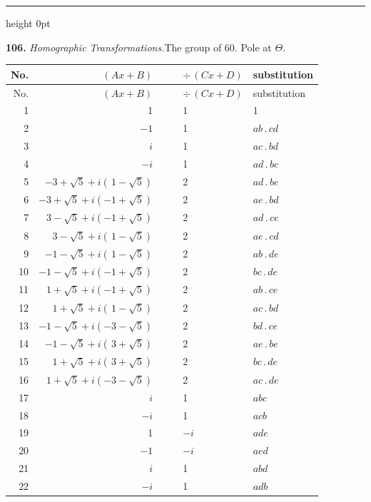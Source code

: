 \documentclass[11pt,a4paper]{article}
\newcommand{\artno}[1]{\textbf{#1.}\quad}
\begin{document}
\bigskip
\hrule height 0pt
\bigskip

\begin{center}
\artno{106} \textit{Homographic Transformations.}\quad The group of 60.
\quad Pole at $\Theta$.
\end{center}

\begin{center}
\footnotesize
\begin{longtable}{r|r|l|l|l|l}
No. & $(A x + B)$ & & & $\div\,(C x + D)$ & substitution\\\hline
\endfirsthead
No. & $(A x + B)$ & & & $\div\,(C x + D)$ & substitution\\\hline
\endhead
1  & 1 & & & 1 & 1\\
2  & $-1$ & & & 1 & $ab\,.\,cd$\\
3  & $i$ & & & 1 & $ac\,.\,bd$\\
4  & $-i$ & & & 1 & $ad\,.\,bc$\\
5  & $-3 + \sqrt5 + i(\,1 - \sqrt5)$ & & & 2 & $ad\,.\,be$\\
6  & $-3 + \sqrt5 + i(-1 + \sqrt5)$ & & & 2 & $ae\,.\,bd$\\
7  & $\;3 - \sqrt5 + i(-1 + \sqrt5)$ & & & 2 & $ad\,.\,ce$\\
8  & $\;3 - \sqrt5 + i(\,1 - \sqrt5)$ & & & 2 & $ae\,.\,cd$\\
9  & $-1 - \sqrt5 + i(\,1 - \sqrt5)$ & & & 2 & $ab\,.\,de$\\
10 & $-1 - \sqrt5 + i(-1 + \sqrt5)$ & & & 2 & $bc\,.\,de$\\
11 & $\;1 + \sqrt5 + i(-1 + \sqrt5)$ & & & 2 & $ab\,.\,ce$\\
12 & $\;1 + \sqrt5 + i(\,1 - \sqrt5)$ & & & 2 & $ac\,.\,bd$\\
13 & $-1 - \sqrt5 + i(-3 - \sqrt5)$ & & & 2 & $bd\,.\,ce$\\
14 & $-1 - \sqrt5 + i(\,3 + \sqrt5)$ & & & 2 & $ae\,.\,be$\\
15 & $\;1 + \sqrt5 + i(\,3 + \sqrt5)$ & & & 2 & $bc\,.\,de$\\
16 & $\;1 + \sqrt5 + i(-3 - \sqrt5)$ & & & 2 & $ac\,.\,de$\\
17 & $i$ & & & 1 & $abc$\\
18 & $-i$ & & & 1 & $acb$\\
19 & 1 & & & $-i$ & $ade$\\
20 & $-1$ & & & $-i$ & $aed$\\
21 & $i$ & & & 1 & $abd$\\
22 & $-i$ & & & 1 & $adb$\\

\end{longtable}
\end{center}
\end{document}
